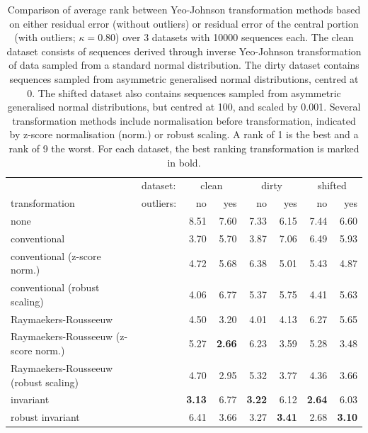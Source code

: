 \documentclass[
  a4paper,
]{article}
\begin{document}
\begin{table}
\begin{center}
\caption{
Comparison of average rank between Yeo-Johnson transformation methods based on either residual error (without outliers) or residual error of the central portion
(with outliers; $\kappa = 0.80$) over 3 datasets with 10000 sequences each. The clean dataset consists of sequences derived through inverse Yeo-Johnson transformation
of data sampled from a standard normal distribution. The dirty dataset contains sequences sampled from asymmetric generalised normal distributions, centred at 0.
The shifted dataset also contains sequences sampled from asymmetric generalised normal distributions, but centred at 100, and scaled by 0.001.
Several transformation methods include normalisation before transformation, indicated by z-score normalisation (norm.) or robust scaling.
A rank of 1 is the best and a rank of 9 the worst. For each dataset, the best ranking transformation is marked in bold.
}
\label{tab:comparison_methods_simulations_yeo_johnson}
\begin{tabular}{l | l r r r r r r}

\toprule
& dataset: & \multicolumn{2}{c}{clean} & \multicolumn{2}{c}{dirty} & \multicolumn{2}{c}{shifted} \\
transformation & outliers: & no & yes & no & yes & no & yes \\

\midrule

none                                  & &         8.51  &         7.60  &         7.33  &         6.15  &         7.44  &         6.60 \\
conventional                          & &         3.70  &         5.70  &         3.87  &         7.06  &         6.49  &         5.93 \\
conventional (z-score norm.)          & &         4.72  &         5.68  &         6.38  &         5.01  &         5.43  &         4.87 \\
conventional (robust scaling)         & &         4.06  &         6.77  &         5.37  &         5.75  &         4.41  &         5.63 \\
Raymaekers-Rousseeuw                  & &         4.50  &         3.20  &         4.01  &         4.13  &         6.27  &         5.65 \\
Raymaekers-Rousseeuw (z-score norm.)  & &         5.27  & \textbf{2.66} &         6.23  &         3.59  &         5.28  &         3.48 \\
Raymaekers-Rousseeuw (robust scaling) & &         4.70  &         2.95  &         5.32  &         3.77  &         4.36  &         3.66 \\
invariant                             & & \textbf{3.13} &         6.77  & \textbf{3.22} &         6.12  & \textbf{2.64} &         6.03 \\
robust invariant                      & &         6.41  &         3.66  &         3.27  & \textbf{3.41} &         2.68  & \textbf{3.10} \\

\bottomrule
\end{tabular}
\end{center}
\end{table}
\end{document}
